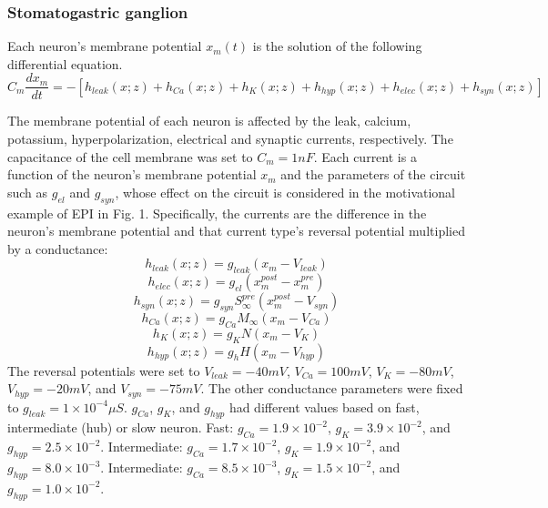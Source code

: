 \documentclass[11pt]{article}
\begin{document}
\subsubsection{Stomatogastric ganglion}\label{methods_STG}
Each neuron's membrane potential $x_m(t)$ is the solution of the following differential equation.
\begin{equation} C_m \frac{dx_m}{dt} = - \left[ h_{leak}(x; z) + h_{Ca}(x; z) + h_K(x; z) + h_{hyp}(x; z) + h_{elec}(x; z) + h_{syn}(x; z)\right] 
\end{equation} 

The membrane potential of each neuron is affected by the leak, calcium, potassium, hyperpolarization,
electrical and synaptic currents, respectively.  The capacitance of the cell membrane was set to $C_m = 1nF$. Each current is a function of the neuron's membrane potential $x_m$ and the parameters of the circuit such as  $g_{el}$ and $g_{syn}$, whose effect on the circuit is considered in the motivational example of EPI in Fig. 1.  Specifically, the currents are the difference in the neuron's membrane potential and that current type's reversal potential multiplied by a conductance:
\begin{equation}  h_{leak}(x; z) = g_{leak} (x_m - V_{leak}) 
\end{equation} 
\begin{equation}  h_{elec}(x; z) = g_{el} (x_m^{post} - x_m^{pre})
\end{equation} 
\begin{equation}  h_{syn}(x; z) = g_{syn} S_\infty^{pre} (x_m^{post} - V_{syn}) \end{equation} 
\begin{equation}  h_{Ca}(x; z) = g_{Ca} M_\infty (x_m - V_{Ca}) 
\end{equation} 
\begin{equation}  h_K(x; z) = g_K N (x_m - V_K) 
\end{equation} 
\begin{equation}  h_{hyp}(x; z) = g_h H(x_m - V_{hyp})
\end{equation} 
The reversal potentials were set to $V_{leak} = -40mV$, $V_{Ca} = 100mV$, $V_K = -80mV$, $V_{hyp} = -20mV$, and $V_{syn} = -75mV$.  The other conductance parameters were fixed to $g_{leak} = 1 \times 10^{-4} \mu S$. $g_{Ca}$, $g_{K}$, and $g_{hyp}$ had different values based on fast, intermediate (hub) or slow neuron.  Fast: $g_{Ca} = 1.9 \times 10^{-2}$, $ g_K = 3.9 \times 10^{-2} $, and $ g_{hyp} = 2.5 \times 10^{-2} $.  Intermediate: $g_{Ca} = 1.7 \times 10^{-2}$, $ g_K = 1.9 \times 10^{-2} $, and $ g_{hyp} = 8.0 \times 10^{-3} $.  Intermediate: $g_{Ca} = 8.5 \times 10^{-3}$, $ g_K = 1.5 \times 10^{-2} $, and $ g_{hyp} = 1.0 \times 10^{-2} $.
\end{document}
